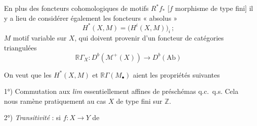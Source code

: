 \documentclass[11pt,a4paper]{article}
\begin{document}
En plus des foncteurs cohomologiques de motifs $R^{*}f_{*}$ [$f$ morphisme de type fini] il y a lieu de considérer également les foncteurs « absolus »
\[
  H^{*}(X, M) = \bigl(H^{i}(X, M)\bigr)_{i} \,;
\]
$M$ motif variable sur $X$, qui doivent provenir d'un foncteur de catégories triangulées
\[
  \mathbb{R}\Gamma_{X} : D^{b}(\mathcal{M}^{+}(X)) \longrightarrow D^{b}(\mathrm{Ab})
\]

On veut que les $H^{*}(X, M)$ et $\mathbb{R}\Gamma(M_{\bullet})$ aient les propriétés suivantes

1°) Commutation aux \emph{lim} essentiellement affines de préschémas q.c.\ q.s. Cela nous ramène pratiquement au cas $X$ de type fini sur $\mathbb{Z}$.

2°) \emph{Transitivité} : si $f : X \to Y$ de
\end{document}
